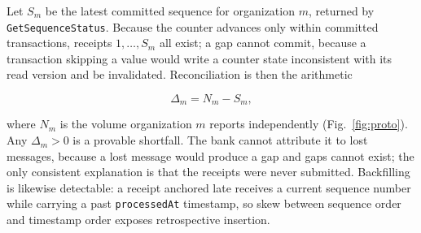 \documentclass[conference]{IEEEtran}
\begin{document}
Let $S_m$ be the latest committed sequence for organization $m$, returned by
\texttt{GetSequenceStatus}. Because the counter advances only within committed
transactions, receipts $1,\dots,S_m$ all exist; a gap cannot commit, because a
transaction skipping a value would write a counter state inconsistent with its
read version and be invalidated. Reconciliation is then the arithmetic

\begin{equation}
\Delta_m = N_m - S_m,
\label{eq:completeness}
\end{equation}

where $N_m$ is the volume organization $m$ reports independently
(Fig.~\ref{fig:proto}). Any $\Delta_m > 0$ is a provable shortfall. The bank
cannot attribute it to lost messages, because a lost message would produce a gap
and gaps cannot exist; the only consistent explanation is that the receipts were
never submitted. Backfilling is likewise detectable: a receipt anchored late
receives a current sequence number while carrying a past \texttt{processedAt}
timestamp, so skew between sequence order and timestamp order exposes
retrospective insertion.
\end{document}
